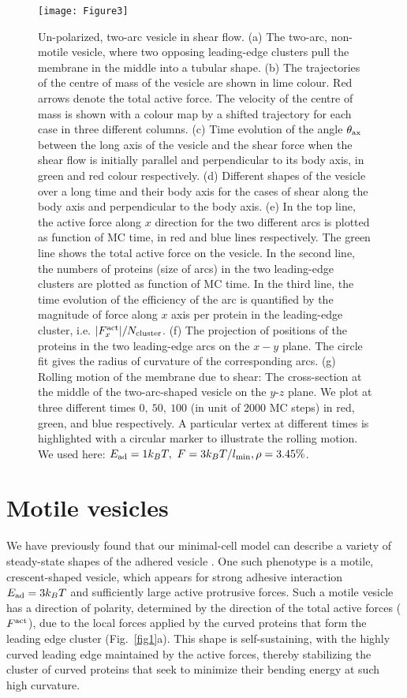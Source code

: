 \documentclass[
reprint,
superscriptaddress,
 amsmath,amssymb,
 aps,
prl,
floatfix]{revtex4-2}
\begin{document}
\begin{figure}
    \centering
    \texttt{[image: Figure3]}
    \caption{Un-polarized, two-arc vesicle in shear flow. (a) The two-arc, non-motile vesicle, where two opposing leading-edge clusters pull the membrane in the middle into a tubular shape. (b) The trajectories of the centre of mass of the vesicle are shown in lime colour. Red arrows denote the total active force. The velocity of the centre of mass is shown with a colour map by a shifted trajectory for each case in three different columns. (c) Time evolution of the angle $\theta_{\rm ax}$ between the long axis of the vesicle and the shear force when the shear flow is initially parallel and perpendicular to its body axis, in green and red colour respectively. (d) Different shapes of the vesicle over a long time and their body axis for the cases of shear along the body axis and perpendicular to the body axis. (e) In the top line, the active force along $x$ direction for the two different arcs is plotted as function of MC time, in red and blue lines respectively. The green line shows the total active force on the vesicle. In the second line, the numbers of proteins (size of arcs) in the two leading-edge clusters are plotted as function of MC time. In the third line, the time evolution of the efficiency of the arc is quantified by the magnitude of force along $x$ axis per protein in the leading-edge cluster, i.e. $|F^{\rm act}_x|/N_{\rm cluster}$. (f) The projection of positions of the proteins in the two leading-edge arcs on the $x-y$ plane. The circle fit gives the radius of curvature of the corresponding arcs. (g) Rolling motion of the membrane due to shear: The cross-section at the middle of the two-arc-shaped vesicle on the $y$-$z$ plane. We plot at three different times $0, ~50, ~100$ (in unit of $2000$ MC steps) in red, green, and blue respectively. A particular vertex at different times is highlighted with a circular marker to illustrate the rolling motion. We used here: $E_{\rm ad}=1 k_BT,~F=3 k_BT/l_{\rm min},\rho=3.45\%$.}
    \label{fig:nonmotile}
\end{figure}
\section{Motile vesicles}
We have previously found that our minimal-cell model can describe a variety of steady-state shapes of the adhered vesicle \cite{sadhu2021modelling}. One such phenotype is a motile, crescent-shaped vesicle, which appears for strong adhesive interaction $E_{\rm ad}=3k_BT$ and sufficiently large active protrusive forces. Such a motile vesicle has a direction of polarity, determined by the direction of the total active forces ($F^{\rm act}$), due to the local forces applied by the curved proteins that form the leading edge cluster (Fig.~\ref{fig1}a). This shape is self-sustaining, with the highly curved leading edge maintained by the active forces, thereby stabilizing the cluster of curved proteins that seek to minimize their bending energy at such high curvature. 
\end{document}
